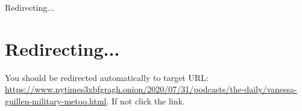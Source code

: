 Redirecting...

\hypertarget{redirecting}{%
\section{Redirecting...}\label{redirecting}}

You should be redirected automatically to target URL:
\url{https://www.nytimes3xbfgragh.onion/2020/07/31/podcasts/the-daily/vanessa-guillen-military-metoo.html}.
If not click the link.
